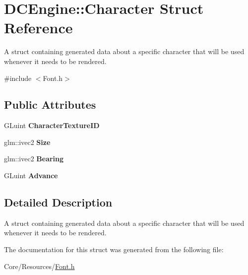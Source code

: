 \hypertarget{structDCEngine_1_1Character}{\section{D\-C\-Engine\-:\-:Character Struct Reference}
\label{structDCEngine_1_1Character}
}


A struct containing generated data about a specific character that will be used whenever it needs to be rendered.  




{\ttfamily \#include $<$Font.\-h$>$}

\subsection*{Public Attributes}
\begin{DoxyCompactItemize}
\item 
\hypertarget{structDCEngine_1_1Character_a6ccc6a669e788621f5ce5c17d2cc91d0}{G\-Luint {\bfseries Character\-Texture\-I\-D}}\label{structDCEngine_1_1Character_a6ccc6a669e788621f5ce5c17d2cc91d0}

\item 
\hypertarget{structDCEngine_1_1Character_a6c3888a28620dce20b10d90f8c2463b1}{glm\-::ivec2 {\bfseries Size}}\label{structDCEngine_1_1Character_a6c3888a28620dce20b10d90f8c2463b1}

\item 
\hypertarget{structDCEngine_1_1Character_aef0f74189925807fe180f1aea85aab7e}{glm\-::ivec2 {\bfseries Bearing}}\label{structDCEngine_1_1Character_aef0f74189925807fe180f1aea85aab7e}

\item 
\hypertarget{structDCEngine_1_1Character_a32bba68b7844b8d18d2a7498fe2a8cc2}{G\-Luint {\bfseries Advance}}\label{structDCEngine_1_1Character_a32bba68b7844b8d18d2a7498fe2a8cc2}

\end{DoxyCompactItemize}


\subsection{Detailed Description}
A struct containing generated data about a specific character that will be used whenever it needs to be rendered. 

The documentation for this struct was generated from the following file\-:\begin{DoxyCompactItemize}
\item 
Core/\-Resources/\hyperlink{Font_8h}{Font.\-h}\end{DoxyCompactItemize}
